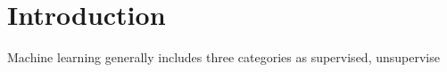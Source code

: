\section{Introduction}

Machine learning generally includes three categories as supervised, unsupervise
